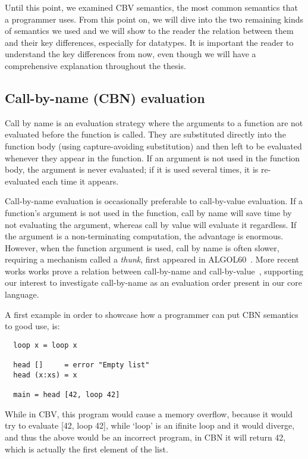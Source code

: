 \documentclass[diploma]{softlab-thesis}
\begin{document}
Until this point, we examined CBV semantics, the most common 
semantics that a programmer uses. From this point on, we will dive into 
the two remaining kinds of semantics we used and we will show to the reader 
the relation between them and their key differences, especially for datatypes.
It is important the reader to understand the key differences from now, even though 
we will have a comprehensive explanation throughout the thesis.

\subsection {Call-by-name (CBN) evaluation}
\label{sec:cbn}

Call by name is an evaluation strategy where the arguments to a function are not evaluated before the function is called. 
They are substituted directly into the function body (using capture-avoiding substitution) and then left to be evaluated 
whenever they appear in the function. If an argument is not used in the function body, the argument is never evaluated; 
if it is used several times, it is re-evaluated each time it appears.

Call-by-name evaluation is occasionally preferable to call-by-value evaluation. If a function's 
argument is not used in the function, call by name will save time by not evaluating the argument, 
whereas call by value will evaluate it regardless. If the argument is a non-terminating computation, 
the advantage is enormous. However, when the function argument is used, call by name is often slower, 
requiring a mechanism called a \emph{thunk}, first appeared in ALGOL60~\cite{Naur78}. More recent works 
works prove a relation between call-by-name and call-by-value~\cite{Wadler03}, supporting our interest 
to investigate call-by-name as an evaluation order present in our core language.

A first example in order to showcase how a programmer can put CBN semantics to good use, is:

\begin{verbatim}
  loop x = loop x

  head []     = error "Empty list"
  head (x:xs) = x

  main = head [42, loop 42]
\end{verbatim}

While in CBV, this program would cause a memory overflow, because it would try to evaluate [42, loop 42],
while `loop' is an ifinite loop and it would diverge, and thus the above would be an incorrect program, 
in CBN it will return 42, which is actually the first element of the list.
\end{document}
